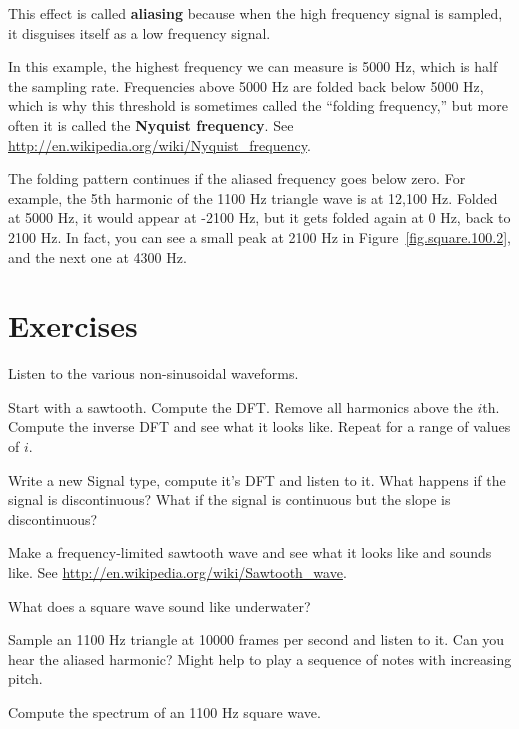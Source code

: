 \documentclass[12pt]{book}
\begin{document}
This effect is called {\bf aliasing} because when the high frequency
signal is sampled, it disguises itself as a low frequency signal.

In this example, the highest frequency we can measure is 5000 Hz,
which is half the sampling rate.  Frequencies above 5000 Hz are folded
back below 5000 Hz, which is why this threshold is sometimes called
the ``folding frequency,'' but more often it is called the {\bf
  Nyquist frequency}.  See
\url{http://en.wikipedia.org/wiki/Nyquist_frequency}.

The folding pattern continues if the aliased frequency goes below
zero.  For example, the 5th harmonic of the 1100 Hz triangle wave is
at 12,100 Hz.  Folded at 5000 Hz, it would appear at -2100 Hz, but it
gets folded again at 0 Hz, back to 2100 Hz.  In fact, you can see a
small peak at 2100 Hz in Figure~\ref{fig.square.100.2}, and the next
one at 4300 Hz.


\section{Exercises}

\begin{exercise}
Listen to the various non-sinusoidal waveforms.
\end{exercise}

\begin{exercise}
Start with a sawtooth.  Compute the DFT.  Remove all harmonics above
the $i$th.
Compute the inverse DFT and see what it looks like.
Repeat for a range of values of $i$.
\end{exercise}

\begin{exercise}
Write a new Signal type, compute it's DFT and listen to it.  What
happens if the signal is discontinuous?  What if the signal is continuous
but the slope is discontinuous?
\end{exercise}

\begin{exercise}
Make a frequency-limited sawtooth wave and see what it looks like
and sounds like.
See \url{http://en.wikipedia.org/wiki/Sawtooth_wave}.

\begin{exercise}
What does a square wave sound like underwater?
\end{exercise}

\begin{exercise}
Sample an 1100 Hz triangle at 10000 frames per second and listen to it.
Can you hear the aliased harmonic?  Might help to play a sequence of
notes with increasing pitch.
\end{exercise}

\begin{exercise}
Compute the spectrum of an 1100 Hz square wave.
\end{exercise}


\end{exercise}
\end{document}
